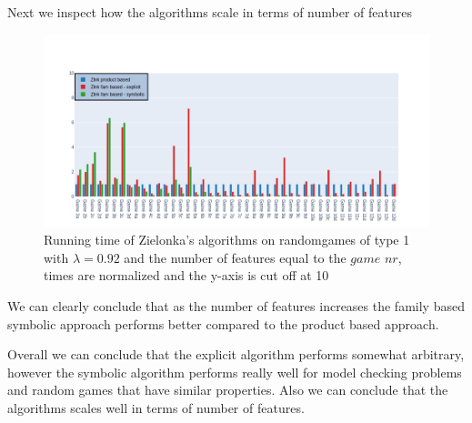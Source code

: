 Next we inspect how the algorithms scale in terms of number of features
\begin{figure}[H]
\includegraphics[width=1\linewidth]{"results/randomscalegames/Zlnk product based_Zlnk fam based - explicit_Zlnk fam based - symbolic_"}
\caption{Running time of Zielonka's algorithms on randomgames of type 1 with $\lambda = 0.92$ and the number of features equal to the $\textit{game nr}$, times are normalized and the y-axis is cut off at 10}
\label{fig:elevatorzlnks}
\end{figure}%
We can clearly conclude that as the number of features increases the family based symbolic approach performs better compared to the product based approach.

Overall we can conclude that the explicit algorithm performs somewhat arbitrary, however the symbolic algorithm performs really well for model checking problems and random games that have similar properties. Also we can conclude that the algorithms scales well in terms of number of features.


